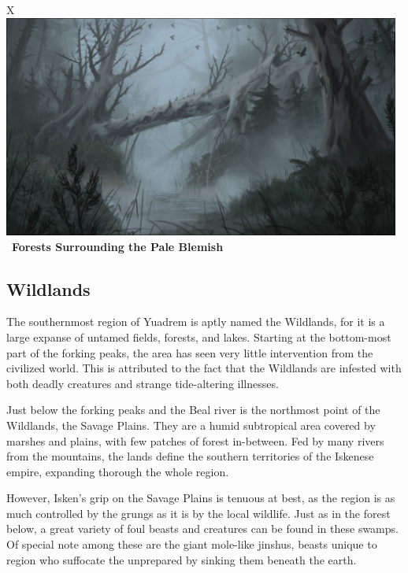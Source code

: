 \begin{table}[t]%
    \begin{DndTable}[width=\linewidth]{X}
        \centering
        \includegraphics[width=0.98\textwidth]{01intro/img/16pale_blemish.png} \
        \centering \large{\textbf{Forests Surrounding the Pale Blemish}}
    \end{DndTable}
\end{table}

\subsection*{Wildlands}
The southernmost region of Yuadrem is aptly named the Wildlands, for it is a large expanse of untamed fields, forests, and lakes.
Starting at the bottom-most part of the forking peaks, the area has seen very little intervention from the civilized world.
This is attributed to the fact that the Wildlands are infested with both deadly creatures and strange tide-altering illnesses.

Just below the forking peaks and the Beal river is the northmost point of the Wildlands, the Savage Plains.
They are a humid subtropical area covered by marshes and plains, with few patches of forest in-between.
Fed by many rivers from the mountains, the lands define the southern territories of the Iskenese empire, expanding thorough the whole region.

However, Isken's grip on the Savage Plains is tenuous at best, as the region is as much controlled by the grungs as it is by the local wildlife.
Just as in the forest below, a great variety of foul beasts and creatures can be found in these swamps.
Of special note among these are the giant mole-like jinshus, beasts unique to region who suffocate the unprepared by sinking them beneath the earth.

